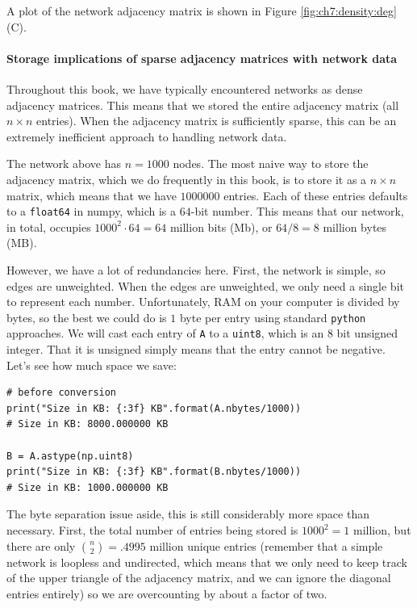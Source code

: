 A plot of the network adjacency matrix is shown in Figure \ref{fig:ch7:density:deg}(C).

\paragraph*{Storage implications of sparse adjacency matrices with network data}

Throughout this book, we have typically encountered networks as dense adjacency matrices. This means that we stored the entire adjacency matrix (all $n \times n$ entries). When the adjacency matrix is sufficiently sparse, this can be an extremely inefficient approach to handling network data. 

The network above has $n=1000$ nodes. The most naive way to store the adjacency matrix, which we do frequently in this book, is to store it as a $n \times n$ matrix, which means that we have $1000000$ entries. Each of these entries defaults to a \texttt{float64} in numpy, which is a $64$-bit number. This means that our network, in total, occupies $1000^2 \cdot 64 = 64$ million bits (Mb), or $64/8 = 8$ million bytes (MB). 

However, we have a lot of redundancies here. First, the network is simple, so edges are unweighted. When the edges are unweighted, we only need a single bit to represent each number. Unfortunately, RAM on your computer is divided by bytes, so the best we could do is $1$ byte per entry using standard \texttt{python} approaches. We will cast each entry of \texttt{A} to a \texttt{uint8}, which is an $8$ bit unsigned integer. That it is unsigned simply means that the entry cannot be negative. Let's see how much space we save:

\begin{lstlisting}[style=python]
# before conversion
print("Size in KB: {:3f} KB".format(A.nbytes/1000))
# Size in KB: 8000.000000 KB

B = A.astype(np.uint8)
print("Size in KB: {:3f} KB".format(B.nbytes/1000))
# Size in KB: 1000.000000 KB
\end{lstlisting}

The byte separation issue aside, this is still considerably more space than necessary. First, the total number of entries being stored is $1000^2 = 1$ million, but there are only $\binom n 2 = .4995$ million unique entries (remember that a simple network is loopless and undirected, which means that we only need to keep track of the upper triangle of the adjacency matrix, and we can ignore the diagonal entries entirely) so we are overcounting by about a factor of two. 

